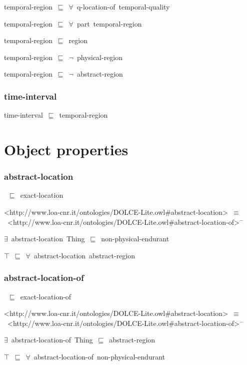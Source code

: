 \documentclass{article}
\begin{document}
temporal-region~\ensuremath{\sqsubseteq}~\ensuremath{\forall}~q-location-of~temporal-quality~

temporal-region~\ensuremath{\sqsubseteq}~\ensuremath{\forall}~part~temporal-region~

temporal-region~\ensuremath{\sqsubseteq}~region~

temporal-region~\ensuremath{\sqsubseteq}~\ensuremath{\lnot}~physical-region

temporal-region~\ensuremath{\sqsubseteq}~\ensuremath{\lnot}~abstract-region

\subsubsection*{time-interval}

time-interval~\ensuremath{\sqsubseteq}~temporal-region~

\section*{Object properties}\subsubsection*{abstract-location}

~\ensuremath{\sqsubseteq}~exact-location

<http://www.loa-cnr.it/ontologies/DOLCE-Lite.owl#abstract-location>~\ensuremath{\equiv}~<http://www.loa-cnr.it/ontologies/DOLCE-Lite.owl#abstract-location-of>\ensuremath{^-}

\ensuremath{\exists}~abstract-location~Thing~\ensuremath{\sqsubseteq}~non-physical-endurant

\ensuremath{\top}~\ensuremath{\sqsubseteq}~\ensuremath{\forall}~abstract-location~abstract-region

\subsubsection*{abstract-location-of}

~\ensuremath{\sqsubseteq}~exact-location-of

<http://www.loa-cnr.it/ontologies/DOLCE-Lite.owl#abstract-location>~\ensuremath{\equiv}~<http://www.loa-cnr.it/ontologies/DOLCE-Lite.owl#abstract-location-of>\ensuremath{^-}

\ensuremath{\exists}~abstract-location-of~Thing~\ensuremath{\sqsubseteq}~abstract-region

\ensuremath{\top}~\ensuremath{\sqsubseteq}~\ensuremath{\forall}~abstract-location-of~non-physical-endurant
\end{document}
